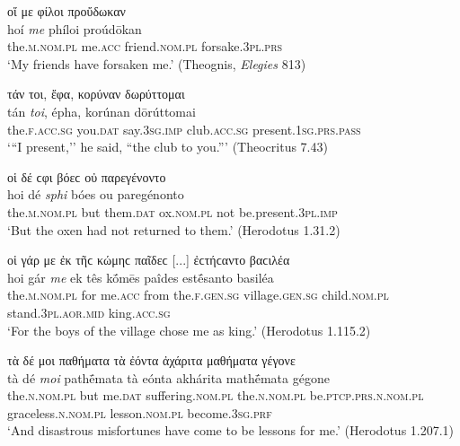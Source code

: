 \begin{exe}
\ex οἵ με φίλοι προὔδωκαν\\
\gll hoí \emph{me} phíloi proúdōkan\\
the.\textsc{m.nom.pl} me.\textsc{acc} friend.\textsc{nom.pl} forsake.\textsc{3pl.prs}\\
\trans `My friends have forsaken me.' (Theognis, \textit{Elegies} 813)
\label{artpron2}
\end{exe}

\begin{exe}
\ex τάν τοι, ἔφα, κορύναν δωρύττομαι\\
\gll tán \emph{toi}, épha, korúnan dōrúttomai\\
the.\textsc{f.acc.sg} you.\textsc{dat} say.\textsc{3sg.imp}
club.\textsc{acc.sg} present.\textsc{1sg.prs.pass}\\
\trans `{``}I present,'' he said, ``the club to you.''' (Theocritus 7.43)
\label{artpron3}
\end{exe}

\begin{exe}
\ex οἱ δέ ϲφι βόεϲ οὐ παρεγένοντο\\
\gll hoi dé \emph{sphi} bóes ou paregénonto\\
the.\textsc{m.nom.pl} but them.\textsc{dat} ox.\textsc{nom.pl} not be.present\textsc{.3pl.imp}\\
\trans `But the oxen had not returned to them.' (Herodotus 1.31.2)
\label{artpron4}
\end{exe}

\begin{exe}
\ex οἱ γάρ με ἐκ τῆϲ κώμηϲ παῖδεϲ {[}...{]} ἐϲτήϲαντο βαϲιλέα\\
\gll hoi gár \emph{me} ek tês kṓmēs paîdes estḗsanto basiléa\\
the.\textsc{m.nom.pl} for me.\textsc{acc} from the.\textsc{f.gen.sg} village.\textsc{gen.sg} child.\textsc{nom.pl} stand.\textsc{3pl.aor.mid} king.\textsc{acc.sg}\\
\trans `For the boys of the village chose me as king.' (Herodotus 1.115.2)
\label{artpron5}
\end{exe}

\begin{exe}
\ex τὰ δέ μοι παθήματα τὰ ἐόντα ἀχάριτα μαθήματα γέγονε\\
\gll tà dé \emph{moi} pathḗmata tà eónta akhárita mathḗmata gégone\\
the.\textsc{n.nom.pl} but me.\textsc{dat} suffering.\textsc{nom.pl}
the.\textsc{n.nom.pl} be.\textsc{ptcp.prs.n.nom.pl} graceless.\textsc{n.nom.pl} lesson.\textsc{nom.pl} become.\textsc{3sg.prf}\\
\trans `And disastrous misfortunes have come to be lessons for me.' (Herodotus 1.207.1)
\label{artpron6}
\end{exe}

